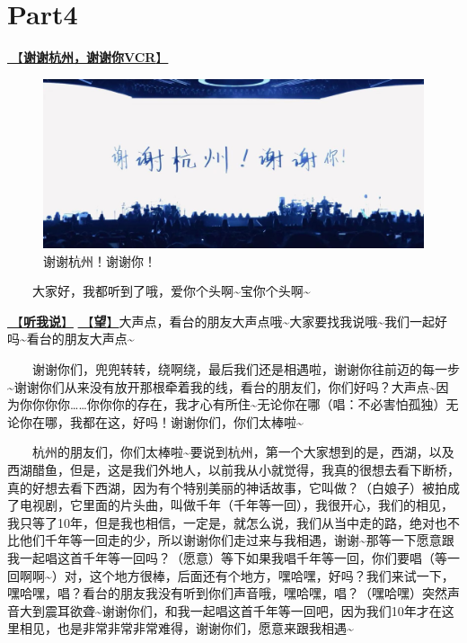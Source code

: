 \documentclass[]{ctexbook}
\begin{document}
\section{Part4}\label{hangzhou-20240823-part4}

\hyperref[thank-you-vcr]{🎥【\textbf{谢谢杭州，谢谢你VCR}】}

\begin{figure}

{\centering \includegraphics[width=400pt]{img/hangzhou20240823/thank-hangzhou} 

}

\caption{谢谢杭州！谢谢你！}\label{fig:unnamed-chunk-82}
\end{figure}

  大家好，我都听到了哦，爱你个头啊\textasciitilde 宝你个头啊\textasciitilde{}

\hyperref[listen-to-me]{🎵【\textbf{听我说}】} \hyperref[hope]{🎵【\textbf{望}】}大声点，看台的朋友大声点哦\textasciitilde 大家要找我说哦\textasciitilde 我们一起好吗\textasciitilde 看台的朋友大声点\textasciitilde{}

  谢谢你们，兜兜转转，绕啊绕，最后我们还是相遇啦，谢谢你往前迈的每一步\textasciitilde 谢谢你们从来没有放开那根牵着我的线，看台的朋友们，你们好吗？大声点\textasciitilde 因为你你你你\ldots\ldots 你你你的存在，我才心有所住\textasciitilde 无论你在哪（唱：不必害怕孤独）无论你在哪，我都在这，好吗！谢谢你们，你们太棒啦\textasciitilde{}

  杭州的朋友们，你们太棒啦\textasciitilde 要说到杭州，第一个大家想到的是，西湖，以及西湖醋鱼，但是，这是我们外地人，以前我从小就觉得，我真的很想去看下断桥，真的好想去看下西湖，因为有个特别美丽的神话故事，它叫做？（白娘子）被拍成了电视剧，它里面的片头曲，叫做千年（千年等一回），我很开心，我们的相见，我只等了10年，但是我也相信，一定是，就怎么说，我们从当中走的路，绝对也不比他们千年等一回走的少，所以谢谢你们走过来与我相遇，谢谢\textasciitilde 那等一下愿意跟我一起唱这首千年等一回吗？（愿意）等下如果我唱千年等一回，你们要唱（等一回啊啊\textasciitilde）对，这个地方很棒，后面还有个地方，嘿哈嘿，好吗？我们来试一下，嘿哈嘿，唱？看台的朋友我没有听到你们声音哦，嘿哈嘿，唱？（嘿哈嘿）突然声音大到震耳欲聋\textasciitilde 谢谢你们，和我一起唱这首千年等一回吧，因为我们10年才在这里相见，也是非常非常非常难得，谢谢你们，愿意来跟我相遇\textasciitilde{}
\end{document}
